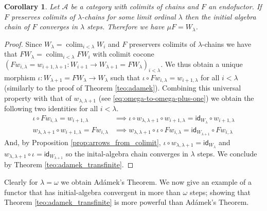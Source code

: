 \documentclass[letterpaper, 11pt, oneside]{memoir}
\theoremstyle{myteo}
\newtheorem{corollary}[theorem]{Corollary}
\numberwithin{equation}{section}
\DeclareMathOperator*\colim{colim}
\newcommand{\id}{\textsf{id}}
\newcommand{\A}{\mathscr{A}}
\begin{document}
\begin{corollary}
  Let \(\A\) be a category with colimits of chains and \(F\) an endofuctor.
  If \(F\) preserves colimits of \(\lambda\)-chains for some limit ordinal \(\lambda\) then the initial algebra chain of \(F\) converges in \(\lambda\) steps.
  Therefore we have \(\mu F = W_\lambda\).
\end{corollary}

\begin{proof}
  Since \(W_\lambda = \colim_{i < \lambda} W_i\) and \(F\) preservers colimits of \(\lambda\)-chains we have that \(FW_\lambda = \colim_{i < \lambda} FW_i\) with colimit cocone \((Fw_{i, \lambda} = w_{i+1, \lambda + 1}: W_{i+1} \to W_{\lambda+1} = FW_\lambda)_{i < \lambda}\).
  We thus obtain a unique morphism \(\iota : W_{\lambda+1} = FW_\lambda \to W_\lambda\) such that \(\iota \circ Fw_{i, \lambda} = w_{i+1, \lambda}\) for all \(i < \lambda\) (similarly to the proof of Theorem \ref{teo:adamek}).
  Combining this universal property with that of \(w_{\lambda, \lambda + 1}\) (see \ref{eq:omega-to-omega-plus-one}) we obtain the following two identities for all \(i < \lambda\).
  \begin{align*}
    \iota \circ Fw_{i, \lambda} = w_{i+1, \lambda} & \implies \iota \circ w_{\lambda, \lambda + 1} \circ w_{i+1, \lambda} = \id_{W_\lambda} \circ w_{i+1, \lambda} \\
    w_{\lambda, \lambda+1} \circ w_{i+1, \lambda} = Fw_{i, \lambda} &\implies w_{\lambda, \lambda+1} \circ \iota \circ Fw_{i, \lambda} = \id_{W_{\lambda+1}} \circ Fw_{i, \lambda}
  \end{align*}
  And, by Proposition \ref{prop:arrows_from_colimit}, \(\iota \circ w_{\lambda, \lambda+1} = \id_{W_\lambda}\) and \(w_{\lambda, \lambda+1} \circ \iota = \id_{W_{\lambda+1}}\) so the inital-algebra chain converges in \(\lambda\) steps.
  We conclude by Theorem \ref{teo:adamek_transfinite}.
\end{proof}

Clearly for \(\lambda = \omega\) we obtain Adámek's Theorem.
We now give an example of a functor that has initial-algebra convergent in more than \(\omega\) steps; showing that Theorem \ref{teo:adamek_transfinite} is more powerful than Adámek's Theorem.
\end{document}

